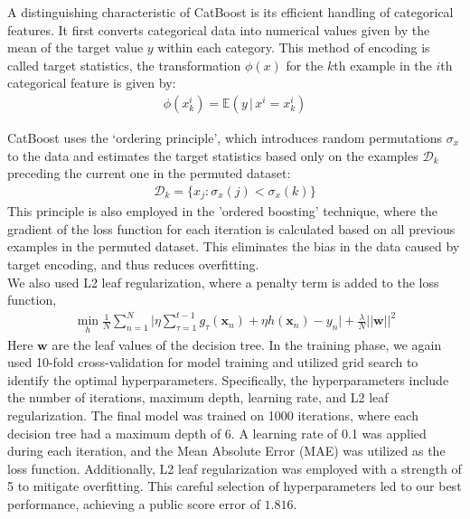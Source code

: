 \documentclass{article}
\begin{document}
\noindent A distinguishing characteristic of CatBoost is its efficient handling of categorical features. It first converts categorical data into numerical values given by the mean of the target value $y$ within each category. This method of encoding is called target statistics, the transformation $\phi(x)$ for the $k$th example in the $i$th categorical feature is given by\cite{catboost}:
\begin{align}
\phi({x}_{k}^i) = \mathbb{E}(y\,|\, x^i = x^i_k)
\end{align}

\noindent CatBoost uses the `ordering principle', which introduces random permutations $\sigma_x$ to the data and estimates the target statistics based only on the examples $\mathcal{D}_k$ preceding the current one in the permuted dataset:
\begin{align}
\mathcal{D}_k=\{x_j:\sigma_x(j)<\sigma_x(k)\}
\end{align}
This principle is also employed in the 'ordered boosting' technique, where the gradient of the loss function for each iteration is calculated based on all previous examples in the permuted dataset. This eliminates the bias in the data caused by target encoding, and thus reduces overfitting.\\

\noindent We also used L2 leaf regularization, where a penalty term is added to the loss function,
\begin{align}
\min_{h}\frac{1}{N}\sum_{n=1}^N\bigg|\eta\sum_{\tau=1}^{t-1}g_\tau(\mathbf{x}_n)+ \eta h(\mathbf{x}_n)- y_n\bigg|+\frac{\lambda}{N}||\mathbf{w}||^2
\end{align}
Here $\mathbf{w}$ are the leaf values of the decision tree. In the training phase, we again used 10-fold cross-validation for model training and utilized grid search to identify the optimal hyperparameters. Specifically, the hyperparameters include the number of iterations, maximum depth, learning rate, and L2 leaf regularization. The final model was trained on 1000 iterations, where each decision tree had a maximum depth of 6. A learning rate of 0.1 was applied during each iteration, and the Mean Absolute Error (MAE) was utilized as the loss function. Additionally, L2 leaf regularization was employed with a strength of 5 to mitigate overfitting. This careful selection of hyperparameters led to our best performance, achieving a public score error of $1.816$.
\end{document}
